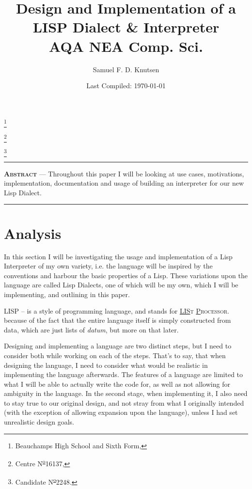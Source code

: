 \documentclass{article}
\renewenvironment{abstract}{
\begin{minipage}{0.95\textwidth}
  \rule{\textwidth}{1pt}}
  {\par\noindent\rule{\textwidth}{1pt}
\end{minipage}}
\newcommand{\super}{\textsuperscript}
\newcommand{\numero}{N\super{\underline{o}}}
\newcommand\blfootnote[1]{%
  \begingroup
  \renewcommand\thefootnote{}\footnote{#1}%
  \addtocounter{footnote}{-1}%
  \endgroup
}
\begin{document}

  \title{Design and Implementation of a\\LISP Dialect \& Interpreter\\
    \medskip
    \large{\textrm{AQA NEA Comp. Sci.}}}
  \author{Samuel F. D. Knutsen}
  \date{Last Compiled: \today}
  \maketitle
  \blfootnote{Beauchamps High School and Sixth Form,}
  \blfootnote{Centre \numero 16137,}
  \blfootnote{Candidate \numero 2248.}
  \clearpage

  \tableofcontents
  \clearpage

  \setlength{\parindent}{2em}
  \setlength{\parskip}{0.75em}

  \begin{abstract}
    \textsc{\textbf{Abstract}} ---
    Throughout this paper I will be looking at use cases, motivations,
    implementation, documentation and usage of building an interpreter for
    our new Lisp Dialect.
    \vspace{-5pt}
  \end{abstract}

\section{Analysis}
  In this section I will be investigating the usage and implementation of
  a Lisp Interpreter of my own variety, i.e. the language will be inspired
  by the conventions and harbour the basic properties of a Lisp. These
  variations upon the language are called Lisp Dialects, one of which will be
  my own, which I will be implementing, and outlining in this paper.

  LISP -- is a style of programming language, and stands for
  \textsc{\underline{LIS}t \underline{P}rocessor}.\\
  because of the fact that the entire language itself is simply constructed from
  data, which are just lists of \emph{datum}, but more on that later.

  Designing and implementing a language are two distinct steps, but I need
  to consider both while working on each of the steps. That's to say, that
  when designing the language, I need to consider what would be realistic in
  implementing the language afterwards. The features of a language are
  limited to what I will be able to actually write the code for, as well as not
  allowing for ambiguity in the language.
  In the second stage, when implementing it, I also
  need to stay true to our original design, and not stray from what I
  originally intended (with the exception of allowing expansion upon the language),
  unless I had set unrealistic design goals.
\end{document}
